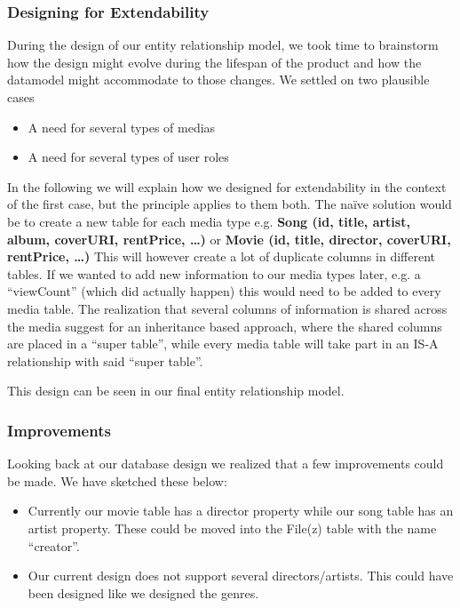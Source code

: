 \subsubsection{Designing for Extendability}
\label{sec:extendability}
During the design of our entity relationship model, we took time to brainstorm how the design might evolve during the lifespan of the product and how the datamodel might accommodate to those changes. We settled on two plausible cases
\begin{itemize}
\item A need for several types of medias
\item A need for several types of user roles
\end{itemize}
In the following we will explain how we designed for extendability in the context of the first case, but the principle applies to them both.
The naïve solution would be to create a new table for each media type e.g. 
\textbf{Song (id, title, artist, album, coverURI, rentPrice, …)} or
\textbf{Movie (id, title, director, coverURI, rentPrice, …)}
This will however create a lot of duplicate columns in different tables. If we wanted to add new information to our media types later, e.g. a “viewCount” (which did actually happen) this would need to be added to every media table.
The realization that several columns of information is shared across the media suggest for an inheritance based approach, where the shared columns are placed in a “super table”, while every media table will take part in an IS-A relationship with said “super table”.

This design can be seen in our final entity relationship model.

\subsubsection{Improvements}
\label{sec:improvementsdatamodel}
Looking back at our database design we realized that a few improvements could be made. We have sketched these below:
\begin{itemize}
\item Currently our movie table has a director property while our song table has an artist property. These could be moved into the File(z) table with the name “creator”.
\item Our current design does not support several directors/artists. This could have been designed like we designed the genres.
\end{itemize}

